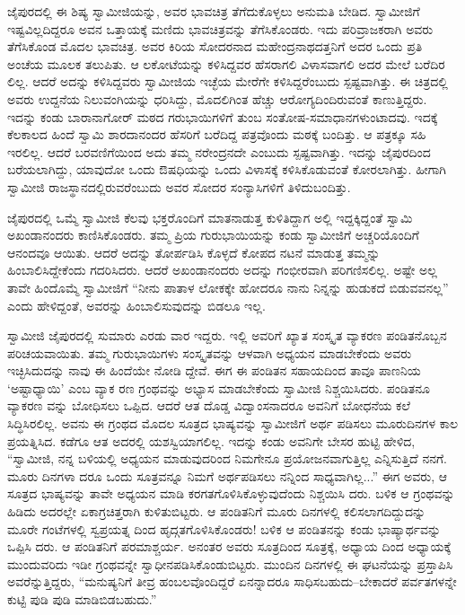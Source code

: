 ಜೈಪುರದಲ್ಲಿ ಈ ಶಿಷ್ಯ ಸ್ವಾಮೀಜಿಯನ್ನು, ಅವರ ಭಾವಚಿತ್ರ ತೆಗೆದುಕೊಳ್ಳಲು ಅನುಮತಿ ಬೇಡಿದ. ಸ್ವಾಮೀಜಿಗೆ ಇಷ್ಟವಿಲ್ಲದಿದ್ದರೂ ಅವನ ಒತ್ತಾಯಕ್ಕೆ ಮಣಿದು ಭಾವಚಿತ್ರವನ್ನು ತೆಗೆಸಿಕೊಂಡರು. ಇದು ಪರಿವ್ರಾಜಕರಾಗಿ ಅವರು ತೆಗೆಸಿಕೊಂಡ ಮೊದಲ ಭಾವಚಿತ್ರ. ಅವರ ಕಿರಿಯ ಸೋದರನಾದ ಮಹೇಂದ್ರನಾಥದತ್ತನಿಗೆ ಅದರ ಒಂದು ಪ್ರತಿ ಅಂಚೆಯ ಮೂಲಕ ತಲುಪಿತು. ಆ ಲಕೋಟೆಯನ್ನು ಕಳಿಸಿದ್ದವರ ಹೆಸರಾಗಲಿ ವಿಳಾಸವಾಗಲಿ ಅದರ ಮೇಲೆ ಬರೆದಿರ ಲಿಲ್ಲ. ಆದರೆ ಅದನ್ನು ಕಳಿಸಿದ್ದವರು ಸ್ವಾಮೀಜಿಯ ಇಚ್ಛೆಯ ಮೇರೆಗೇ ಕಳಿಸಿದ್ದರೆಂಬುದು ಸ್ಪಷ್ಟವಾಗಿತ್ತು. ಈ ಚಿತ್ರದಲ್ಲಿ ಅವರು ಉದ್ದನೆಯ ನಿಲುವಂಗಿಯನ್ನು ಧರಿಸಿದ್ದು, ಮೊದಲಿಗಿಂತ ಹೆಚ್ಚು ಆರೋಗ್ಯದಿಂದಿರುವಂತೆ ಕಾಣುತ್ತಿದ್ದರು. ಇದನ್ನು ಕಂಡು ಬಾರಾನಾಗೋರ್ ಮಠದ ಗರುಭಾಯಿಗಳಿಗೆ ತುಂಬ ಸಂತೋಷ-ಸಮಾಧಾನಗಳುಂಟಾದವು. ಇದಕ್ಕೆ ಕೆಲಕಾಲದ ಹಿಂದೆ ಸ್ವಾಮಿ ಶಾರದಾನಂದರ ಹೆಸರಿಗೆ ಬರೆದಿದ್ದ ಪತ್ರವೊಂದು ಮಠಕ್ಕೆ ಬಂದಿತ್ತು. ಆ ಪತ್ರಕ್ಕೂ ಸಹಿ ಇರಲಿಲ್ಲ. ಆದರೆ ಬರವಣಿಗೆಯಿಂದ ಅದು ತಮ್ಮ ನರೇಂದ್ರನದೇ ಎಂಬುದು ಸ್ಪಷ್ಟವಾಗಿತ್ತು. ಇದನ್ನು ಜೈಪುರದಿಂದ ಬರೆಯಲಾಗಿದ್ದು, ಯಾವುದೋ ಒಂದು ಔಷಧಿಯನ್ನು ಒಂದು ವಿಳಾಸಕ್ಕೆ ಕಳಿಸಿಕೊಡುವಂತೆ ಕೋರಲಾಗಿತ್ತು. ಹೀಗಾಗಿ ಸ್ವಾಮೀಜಿ ರಾಜಸ್ಥಾನದಲ್ಲಿರುವರೆಂಬುದು ಅವರ ಸೋದರ ಸಂನ್ಯಾಸಿಗಳಿಗೆ ತಿಳಿದುಬಂದಿತ್ತು.

ಜೈಪುರದಲ್ಲಿ ಒಮ್ಮೆ ಸ್ವಾಮೀಜಿ ಕೆಲವು ಭಕ್ತರೊಂದಿಗೆ ಮಾತನಾಡುತ್ತ ಕುಳಿತಿದ್ದಾಗ ಅಲ್ಲಿ ಇದ್ದಕ್ಕಿದ್ದಂತೆ ಸ್ವಾಮಿ ಅಖಂಡಾನಂದರು ಕಾಣಿಸಿಕೊಂಡರು. ತಮ್ಮ ಪ್ರಿಯ ಗುರುಭಾಯಿಯನ್ನು ಕಂಡು ಸ್ವಾಮೀಜಿಗೆ ಅಚ್ಚರಿಯೊಂದಿಗೆ ಆನಂದವೂ ಆಯಿತು. ಆದರೆ ಅದನ್ನು ತೋರ್ಪಡಿಸಿ ಕೊಳ್ಳದೆ ಕೋಪದ ನಟನೆ ಮಾಡುತ್ತ ತಮ್ಮನ್ನು ಹಿಂಬಾಲಿಸಿದ್ದೇಕೆಂದು ಗದರಿಸಿದರು. ಆದರೆ ಅಖಂಡಾನಂದರು ಅದನ್ನು ಗಂಭೀರವಾಗಿ ಪರಿಗಣಿಸಲಿಲ್ಲ. ಅಷ್ಟೇ ಅಲ್ಲ ತಾವೇ ಹಿಂದೊಮ್ಮೆ ಸ್ವಾಮೀಜಿಗೆ “ನೀನು ಪಾತಾಳ ಲೋಕಕ್ಕೇ ಹೋದರೂ ನಾನು ನಿನ್ನನ್ನು ಹುಡುಕದೆ ಬಿಡುವವನಲ್ಲ” ಎಂದು ಹೇಳಿದ್ದಂತೆ, ಅವರನ್ನು ಹಿಂಬಾಲಿಸುವುದನ್ನು ಬಿಡಲೂ ಇಲ್ಲ.

ಸ್ವಾಮೀಜಿ ಜೈಪುರದಲ್ಲಿ ಸುಮಾರು ಎರಡು ವಾರ ಇದ್ದರು. ಇಲ್ಲಿ ಅವರಿಗೆ ಖ್ಯಾತ ಸಂಸ್ಕೃತ ವ್ಯಾಕರಣ ಪಂಡಿತನೊಬ್ಬನ ಪರಿಚಯವಾಯಿತು. ತಮ್ಮ ಗುರುಭಾಯಿಗಳು ಸಂಸ್ಕೃತವನ್ನು ಆಳವಾಗಿ ಅಧ್ಯಯನ ಮಾಡಬೇಕೆಂದು ಅವರು ಇಚ್ಛಿಸಿದುದನ್ನು ನಾವು ಈ ಹಿಂದೆಯೇ ನೋಡಿ ದ್ದೇವೆ. ಈಗ ಈ ಪಂಡಿತನ ಸಹಾಯದಿಂದ ತಾವೂ ಪಾಣನಿಯ ‘ಅಷ್ಟಾಧ್ಯಾಯಿ’ ಎಂಬ ವ್ಯಾಕ ರಣ ಗ್ರಂಥವನ್ನು ಅಭ್ಯಾಸ ಮಾಡಬೇಕೆಂದು ಸ್ವಾಮೀಜಿ ನಿಶ್ಚಯಿಸಿದರು. ಪಂಡಿತನೂ ವ್ಯಾಕರಣ ವನ್ನು ಬೋಧಿಸಲು ಒಪ್ಪಿದ. ಆದರೆ ಆತ ದೊಡ್ಡ ವಿದ್ವಾಂಸನಾದರೂ ಅವನಿಗೆ ಬೋಧನೆಯ ಕಲೆ ಸಿದ್ಧಿಸಿರಲಿಲ್ಲ. ಅವನು ಈ ಗ್ರಂಥದ ಮೊದಲ ಸೂತ್ರದ ಭಾಷ್ಯವನ್ನು ಸ್ವಾಮೀಜಿಗೆ ಅರ್ಥ ಪಡಿಸಲು ಮೂರುದಿನಗಳ ಕಾಲ ಪ್ರಯತ್ನಿಸಿದ. ಕಡೆಗೂ ಆತ ಅದರಲ್ಲಿ ಯಶಸ್ವಿಯಾಗಲಿಲ್ಲ. ಇದನ್ನು ಕಂಡು ಅವನಿಗೇ ಬೇಸರ ಹುಟ್ಟಿ ಹೇಳಿದ, “ಸ್ವಾಮೀಜಿ, ನನ್ನ ಬಳಿಯಲ್ಲಿ ಅಧ್ಯಯನ ಮಾಡುವುದರಿಂದ ನಿಮಗೇನೂ ಪ್ರಯೋಜನವಾಗುತ್ತಿಲ್ಲ ಎನ್ನಿಸುತ್ತಿದೆ ನನಗೆ. ಮೂರು ದಿನಗಳಾ ದರೂ ಒಂದು ಸೂತ್ರವನ್ನೂ ನಿಮಗೆ ಅರ್ಥಪಡಿಸಲು ನನ್ನಿಂದ ಸಾಧ್ಯವಾಗಿಲ್ಲ...” ಈಗ ಅವರು, ಆ ಸೂತ್ರದ ಭಾಷ್ಯವನ್ನು ತಾವೇ ಅಧ್ಯಯನ ಮಾಡಿ ಕರಗತಗೊಳಿಸಿಕೊಳ್ಳುವುದೆಂದು ನಿಶ್ಚಯಿಸಿ ದರು. ಬಳಿಕ ಆ ಗ್ರಂಥವನ್ನು ಹಿಡಿದು ಅದರಲ್ಲೇ ಏಕಾಗ್ರಚಿತ್ತರಾಗಿ ಕುಳಿತುಬಿಟ್ಟರು. ಆ ಪಂಡಿತನಿಗೆ ಮೂರು ದಿನಗಳಲ್ಲಿ ಕಲಿಸಲಾಗದಿದ್ದುದನ್ನು ಮೂರೇ ಗಂಟೆಗಳಲ್ಲಿ ಸ್ವಪ್ರಯತ್ನ ದಿಂದ ಹೃದ್ಗತಗೊಳಿಸಿಕೊಂಡರು! ಬಳಿಕ ಆ ಪಂಡಿತನನ್ನು ಕಂಡು ಭಾಷ್ಯಾರ್ಥವನ್ನು ಒಪ್ಪಿಸಿ ದರು. ಆ ಪಂಡಿತನಿಗೆ ಪರಮಾಶ್ಚರ್ಯ. ಅನಂತರ ಅವರು ಸೂತ್ರದಿಂದ ಸೂತ್ರಕ್ಕೆ, ಅಧ್ಯಾಯ ದಿಂದ ಅಧ್ಯಾಯಕ್ಕೆ ಮುಂದುವರಿದು ಇಡೀ ಗ್ರಂಥವನ್ನೇ ಸ್ವಾಧೀನಪಡಿಸಿಕೊಂಡುಬಿಟ್ಟರು. ಮುಂದಿನ ದಿನಗಳಲ್ಲಿ ಈ ಘಟನೆಯನ್ನು ಪ್ರಸ್ತಾಪಿಸಿ ಅವರೆನ್ನುತ್ತಿದ್ದರು, “ಮನುಷ್ಯನಿಗೆ ತೀವ್ರ ಹಂಬಲವೊಂದಿದ್ದರೆ ಏನನ್ನಾದರೂ ಸಾಧಿಸಬಹುದು–ಬೇಕಾದರೆ ಪರ್ವತಗಳನ್ನೇ ಕುಟ್ಟಿ ಪುಡಿ ಪುಡಿ ಮಾಡಿಬಿಡಬಹುದು.”

